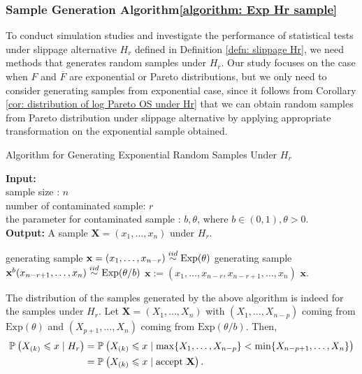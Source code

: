 \documentclass{report}
\begin{document}
\subsubsection{Sample Generation Algorithm\ref{algorithm: Exp Hr sample}}

To conduct simulation studies and investigate the performance of statistical tests under slippage alternative $H_r$ defined in Definition \ref{defn: slippage Hr},
we need methods that generates random samples under $H_r$. Our study focuses on the case when $F$ and $\overline F$ are exponential or Pareto distributions,
but we only need to consider generating samples from exponential case, since it follows from Corollary \ref{cor: distribution of log Pareto OS under Hr}
that we can obtain random samples from Pareto distribution under slippage alternative by applying appropriate transformation on the exponential sample obtained.

\begin{algorithm}
    \caption{Algorithm for Generating Exponential Random Samples Under $H_r$} \label{algorithm: Exp Hr sample}
    \hspace*{0.02in} {\bf Input:} \\
     sample size : $n$ \\
     number of contaminated sample: $r$ \\
     the parameter for contaminated sample : $b, \theta$, where $b \in (0,1), \theta > 0$. \\
     \hspace*{0.02in} {\bf Output:}
       A sample $\mathbf X = (x_1,\ldots,x_n)$ under $H_r$.
       \begin{algorithmic}[1]
        \Repeat
          \State generating sample $\mathbf x = (x_1,\ldots,x_{n-r}) \iidis \mathrm{Exp}(\theta) $
          \State generating sample $\mathbf x^b (x_{n-r+1},\ldots, x_{n}) \iidis \mathrm{Exp}(\theta/b)$
           \State $\mathbf x := (x_1,\ldots, x_{n-r}, x_{n-r+1},\ldots,x_n)$
        \State \Return $\mathbf x$.
       \end{algorithmic}
   \end{algorithm}

The distribution of the samples generated by the above algorithm is indeed for the samples under $H_r$. Let
$\mathbf X = (X_1,\ldots, X_n)$ with $(X_1,\ldots, X_{n-p})$ coming from $\mathrm{Exp}(\theta)$ and 
$(X_{p+1},\ldots, X_{n})$ coming from $\mathrm{Exp}(\theta/b)$. Then,
\begin{align*}
    \P{X_{(k)} \leqslant x \mid H_r} &= \P{X_{(k)} \leqslant x \mid \max\{X_{1},\ldots, X_{n-p}\} < \min\{X_{n-p+1},\ldots, X_{n}\} }
    \\
    &= \P{X_{(k)} \leqslant x \mid \text{accept $\mathbf X$} }.
\end{align*}
\end{document}

